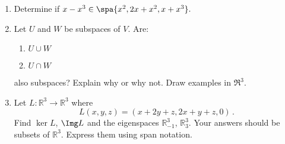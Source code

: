 


\begin{enumerate}


\item \label{subspaces_spanning_sets_polynolmial_span} {Determine} if  
$x-x^3 \in \spa\{ x^2, 2x+x^2, x+x^3 \}.$


\item\label{UandV} \hypertarget{intersections}{Let} $U$ and $W$ be subspaces of $V$.  Are:
\label{UcapV}
\begin{enumerate}
\item $U\cup W$
\item $U\cap W$
\end{enumerate}
also subspaces?  Explain why or why not.  Draw examples in $\Re^3$.



\item Let $L:{\mathbb R}^3\to {\mathbb R}^3$ where \[L(x,y,z)=(x+2y+z,2x+y+z,0)\, .\] 
Find $\ker L$, $\Img L$ and the eigenspaces ${\mathbb R}^3_{-1}$, ${\mathbb R}^3_{3}$. Your answers should be subsets of ${\mathbb R}^3$. Express them using span notation.

\end{enumerate}


